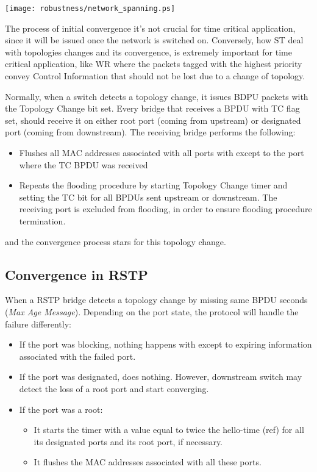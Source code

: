 \begin{center}
        \texttt{[image: robustness/network\_spanning.ps]}
        \label{fig:free_loops}
\end{center}

The process of initial convergence it's not crucial for time
critical application, since it will be issued once the network is switched on.
Conversely, how ST deal with topologies changes and its
convergence, is extremely important for time critical application, like WR where
the packets tagged with the highest priority convey Control Information that
should not be lost due to a change of topology.

Normally, when a switch detects a topology change, it issues BDPU packets with
the Topology Change bit set. Every bridge that receives a BPDU with TC flag set,
should  receive it on either root port (coming from upstream) or designated port
(coming from downstream). The receiving bridge performs the following:
\begin{itemize}

        \item Flushes all MAC addresses associated with all ports with except to
the port where the TC BPDU was received
        \item Repeats the flooding procedure by starting Topology Change timer
and setting the TC bit for all BPDUs sent upstream or downstream. The receiving
port is excluded from flooding, in order to ensure flooding procedure
termination.
\end{itemize}
and the convergence process stars for this topology change. 

\subsection{Convergence in RSTP}

When a RSTP bridge detects a topology change by missing same BPDU seconds
(\textsl{Max Age Message}). Depending on the port state, the protocol will
handle the failure differently: 

\begin{itemize}

	\item If the port was blocking, nothing happens with except to expiring 
information associated with the failed port.
	\item If the port was designated, does nothing. However, downstream
switch may detect the loss of a root port and start converging. 
	\item If the port was a root: 

	\begin{itemize}
		\item It starts the  timer with a value equal to twice the 
hello-time (ref) for all its designated ports and its root port, if necessary.
		\item It flushes the MAC addresses associated with all these
ports.
	\end{itemize}

\end{itemize}


